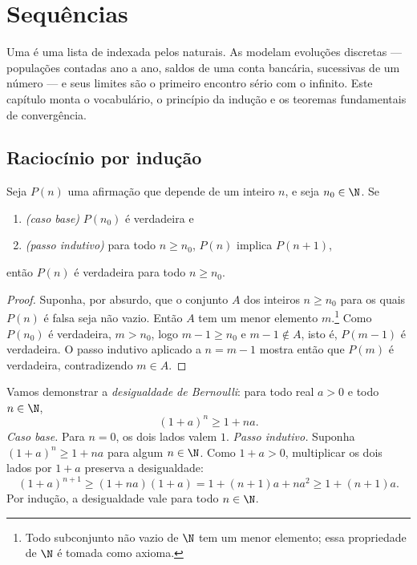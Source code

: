 \chapter{Sequências}\label{ch:g12:seq}

Uma  é uma lista de  indexada pelos naturais. As
 modelam evoluções discretas --- populações contadas ano a ano,
saldos de uma conta bancária,  sucessivas de um número --- e
seus limites são o primeiro encontro sério com o infinito. Este capítulo
monta o vocabulário, o princípio da indução e os teoremas fundamentais de
convergência.

\section{Raciocínio por indução}

\begin{theorem}\label{thm:g12:seq:induction}
Seja $P(n)$ uma afirmação que depende de um inteiro $n$, e seja
$n_0 \in \N$. Se
\begin{enumerate}
  \item \emph{(caso base)} $P(n_0)$ é verdadeira e
  \item \emph{(passo indutivo)} para todo $n \geq n_0$, $P(n)$ implica
        $P(n+1)$,
\end{enumerate}
então $P(n)$ é verdadeira para todo $n \geq n_0$.
\end{theorem}

\begin{proof}
Suponha, por absurdo, que o conjunto $A$ dos inteiros $n \geq n_0$ para os
quais $P(n)$ é falsa seja não vazio. Então $A$ tem um menor elemento
$m$.\footnote{Todo subconjunto não vazio de $\N$ tem um menor elemento;
essa propriedade de $\N$ é tomada como axioma.} Como $P(n_0)$ é
verdadeira, $m > n_0$, logo $m - 1 \geq n_0$ e $m-1 \notin A$, isto é,
$P(m-1)$ é verdadeira. O passo indutivo aplicado a $n = m-1$ mostra então
que $P(m)$ é verdadeira, contradizendo $m \in A$.
\end{proof}

\begin{example}\label{ex:g12:seq:bernoulli}
Vamos demonstrar a \emph{desigualdade de Bernoulli}: para todo real
$a > 0$ e todo $n \in \N$,
\[
(1+a)^n \geq 1 + na.
\]
\emph{Caso base.} Para $n = 0$, os dois lados valem $1$.
\emph{Passo indutivo.} Suponha $(1+a)^n \geq 1+na$ para algum
$n \in \N$. Como $1 + a > 0$, multiplicar os dois lados por $1+a$ preserva
a desigualdade:
\[
(1+a)^{n+1} \geq (1+na)(1+a) = 1 + (n+1)a + na^2 \geq 1 + (n+1)a .
\]
Por indução, a desigualdade vale para todo $n \in \N$.
\end{example}

